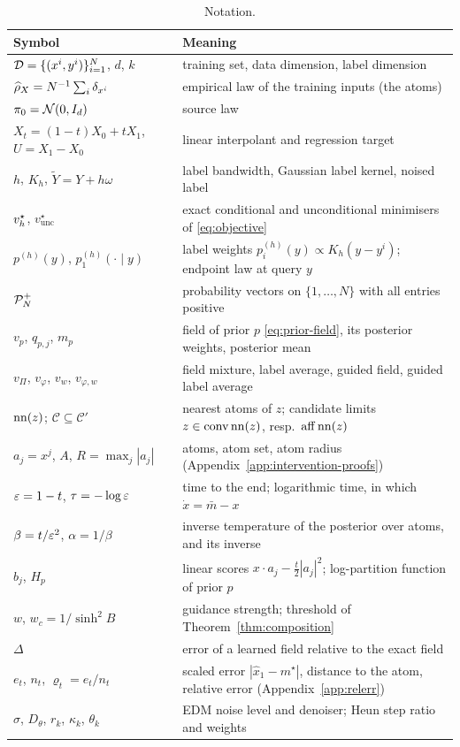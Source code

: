 \documentclass{article} %
\theoremstyle{plain}
\theoremstyle{definition}
\theoremstyle{remark}
\begin{document}
\begin{table}[h]
\centering\small
\begin{tabular}{@{}p{}p{}@{}}
\toprule
Symbol & Meaning\\
\midrule
$\mathcal{D}=\{(x^i,y^i)\}_{i=1}^N$, $d$, $k$ & training set, data dimension, label dimension\\
$\widehat{\rho}_X=N^{-1}\sum_i\delta_{x^i}$ & empirical law of the training inputs (the atoms)\\
$\pi_0=\mathcal{N}(0,I_d)$ & source law\\
$X_t=(1-t)X_0+tX_1$, $U=X_1-X_0$ & linear interpolant and regression target\\
$h$, $K_h$, $\widetilde Y=Y+h\omega$ & label bandwidth, Gaussian label kernel, noised label\\
$v_h^\star$, $v_{\mathrm{unc}}^\star$ & exact conditional and unconditional minimisers of \eqref{eq:objective}\\
$p^{(h)}(y)$, $p_1^{(h)}(\cdot\mid y)$ & label weights $p_i^{(h)}(y)\propto K_h(y-y^i)$; endpoint law at query $y$\\
$\mathcal{P}_N^{+}$ & probability vectors on $\{1,\dots,N\}$ with all entries positive\\
$v_p$, $q_{p,j}$, $m_p$ & field of prior $p$ \eqref{eq:prior-field}, its posterior weights, posterior mean\\
$v_\Pi$, $v_\varphi$, $v_w$, $v_{\varphi,w}$ & field mixture, label average, guided field, guided label average\\
$\operatorname{nn}(z)$; $\mathcal C\subseteq\mathcal C'$ & nearest atoms of $z$; candidate limits $z\in\operatorname{conv}\operatorname{nn}(z)$, resp.\ $\operatorname{aff}\operatorname{nn}(z)$\\
$a_j=x^j$, $A$, $R=\max_j|a_j|$ & atoms, atom set, atom radius (Appendix~\ref{app:intervention-proofs})\\
$\varepsilon=1-t$, $\tau=-\log\varepsilon$ & time to the end; logarithmic time, in which $\dot x=\bar m-x$\\
$\beta=t/\varepsilon^2$, $\alpha=1/\beta$ & inverse temperature of the posterior over atoms, and its inverse\\
$b_j$, $H_p$ & linear scores $x\cdot a_j-\tfrac t2|a_j|^2$; log-partition function of prior $p$\\
$w$, $w_c=1/\sinh^2B$ & guidance strength; threshold of Theorem~\ref{thm:composition}\\
$\Delta$ & error of a learned field relative to the exact field\\
$e_t$, $n_t$, $\varrho_t=e_t/n_t$ & scaled error $|\hat x_1-m^\star|$, distance to the atom, relative error (Appendix~\ref{app:relerr})\\
$\sigma$, $D_\theta$, $r_k$, $\kappa_k$, $\theta_k$ & EDM noise level and denoiser; Heun step ratio and weights\\
\bottomrule
\end{tabular}
\caption{Notation.}
\label{tab:notation}
\end{table}
\end{document}
